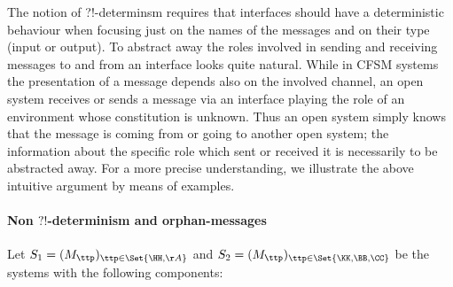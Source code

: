 {The notion of  ?!-determinsm requires that interfaces should have a deterministic
behaviour when focusing just on the names of the messages and on their type (input or output).
To abstract away the roles involved in sending and receiving messages to and from an interface
looks quite natural.
While in CFSM systems the presentation of a message 
depends also on the involved channel, an open system
receives or sends a message via an interface playing the role of an environment whose constitution is unknown.
Thus an open system simply knows that the message is coming from or going to another open system; the information about the specific role which sent or received it is necessarily to be abstracted away.
For a more precise understanding, we illustrate the above intuitive argument by means of examples.

\paragraph{Non $?!$-determinism and orphan-messages}


Let $S_1 = (M_\ttp)_{\ttp\in\Set{\HH,\AA}}$ and $S_2 = (M_\ttp)_{\ttp\in\Set{\KK,\BB,\CC}}$ be the systems
with the following components:

}

